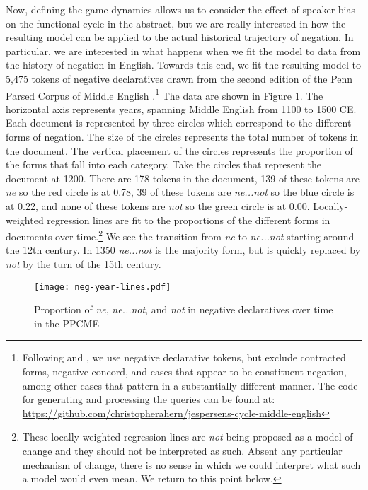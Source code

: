 \documentclass[linguex]{sp}
\theoremstyle{definition} \newtheorem{definition}{Definition}
\begin{document}
Now, defining the game dynamics allows us to consider the effect of speaker bias on the functional cycle in the abstract, but we are really interested in how the resulting model can be applied to the actual historical trajectory of negation. In particular, we are interested in what happens when we fit the model to data from the history of negation in English. Towards this end, we fit the resulting model to 5,475 tokens of negative declaratives drawn from the second edition of the Penn Parsed Corpus of Middle English \citep{ppcme2}.\footnote{Following \cite{wallage2008} and \cite{ecay-tamminga2015}, we use negative declarative tokens, but exclude contracted forms, negative concord, and cases that appear to be constituent negation, among other cases that pattern in a substantially different manner. The code for generating and processing the queries can be found at: \url{https://github.com/christopherahern/jespersens-cycle-middle-english}} The data are shown in Figure \ref{neg-three-plot}. The horizontal axis represents years, spanning Middle English from 1100 to 1500 CE. Each document is represented by three circles which correspond to the different forms of negation. The size of the circles represents the total number of tokens in the document. The vertical placement of the circles represents the proportion of the forms that fall into each category. Take the circles that represent the document at 1200.  There are 178 tokens in the document, 139 of these tokens are \textit{\color{red} ne} so the red circle is at 0.78, 39 of these tokens are \textit{\color{blue} ne...not} so the blue circle is at 0.22, and none of these tokens are \textit{\color{green} not} so the green circle is at 0.00.  Locally-weighted regression lines are fit to the proportions of the different forms in documents over time.\footnote{These locally-weighted regression lines are \emph{not} being proposed as a model of change and they should not be interpreted as such. Absent any particular mechanism of change, there is no sense in which we could interpret what such a model would even mean. We return to this point below.} We see the transition from \textit{\color{red} ne} to \textit{\color{blue} ne...not} starting around the 12th century. In 1350 \textit{\color{blue} ne...not} is the majority form, but is quickly replaced by \textit{\color{green} not} by the turn of the 15th century.


\begin{figure}
\centering
     \texttt{[image: neg-year-lines.pdf]}
\caption{Proportion of \textit{\color{red} ne}, \textit{\color{blue} ne...not}, and \textit{\color{green} not}  in negative declaratives over time in the PPCME}
\label{neg-three-plot}
\end{figure}
\end{document}
